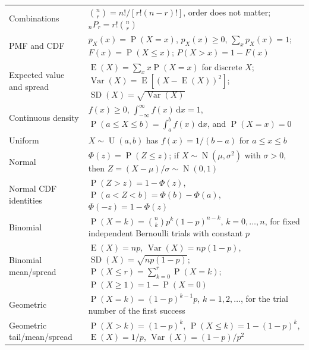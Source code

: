 \documentclass[11pt]{article}
\newcommand{\Pp}{\operatorname{P}}
\newcommand{\E}{\operatorname{E}}
\newcommand{\Var}{\operatorname{Var}}
\newcommand{\SD}{\operatorname{SD}}
\newcommand{\N}{\operatorname{N}}
\newcommand{\Unif}{\operatorname{U}}
\newcommand{\dd}{\,\mathrm{d}}
\begin{document}
\begin{table}[ht]
\begin{tabularx}{\textwidth}{@{}lY@{}}
Combinations & $\binom{n}{r}=n!/[r!(n-r)!]$, order does not matter; ${}_nP_r=r!\binom nr$ \\
PMF and CDF & $p_X(x)=\Pp(X=x)$, $p_X(x)\ge0$, $\sum_xp_X(x)=1$; $F(x)=\Pp(X\le x)$; $P(X>x)=1-F(x)$ \\
Expected value and spread & $\E(X)=\sum_xx\Pp(X=x)$ for discrete $X$; $\Var(X)=\E[(X-\E(X))^2]$; $\SD(X)=\sqrt{\Var(X)}$ \\
Continuous density & $f(x)\ge0$, $\int_{-\infty}^{\infty}f(x)\dd x=1$, $\Pp(a\le X\le b)=\int_a^bf(x)\dd x$, and $\Pp(X=x)=0$ \\
Uniform & $X\sim\Unif(a,b)$ has $f(x)=1/(b-a)$ for $a\le x\le b$ \\
Normal & $\Phi(z)=\Pp(Z\le z)$; if $X\sim\N(\mu,\sigma^2)$ with $\sigma>0$, then $Z=(X-\mu)/\sigma\sim\N(0,1)$ \\
Normal CDF identities & $\Pp(Z>z)=1-\Phi(z)$, $\Pp(a<Z<b)=\Phi(b)-\Phi(a)$, $\Phi(-z)=1-\Phi(z)$ \\
Binomial & $\Pp(X=k)=\binom nkp^k(1-p)^{n-k}$, $k=0,\ldots,n$, for fixed independent Bernoulli trials with constant $p$ \\
Binomial mean/spread & $\E(X)=np$, $\Var(X)=np(1-p)$, $\SD(X)=\sqrt{np(1-p)}$; $\Pp(X\le r)=\sum_{k=0}^r\Pp(X=k)$; $\Pp(X\ge1)=1-\Pp(X=0)$ \\
Geometric & $\Pp(X=k)=(1-p)^{k-1}p$, $k=1,2,\ldots$, for the trial number of the first success \\
Geometric tail/mean/spread & $\Pp(X>k)=(1-p)^k$, $\Pp(X\le k)=1-(1-p)^k$, $\E(X)=1/p$, $\Var(X)=(1-p)/p^2$ \\
\bottomrule
\end{tabularx}
\end{table}
\end{document}
